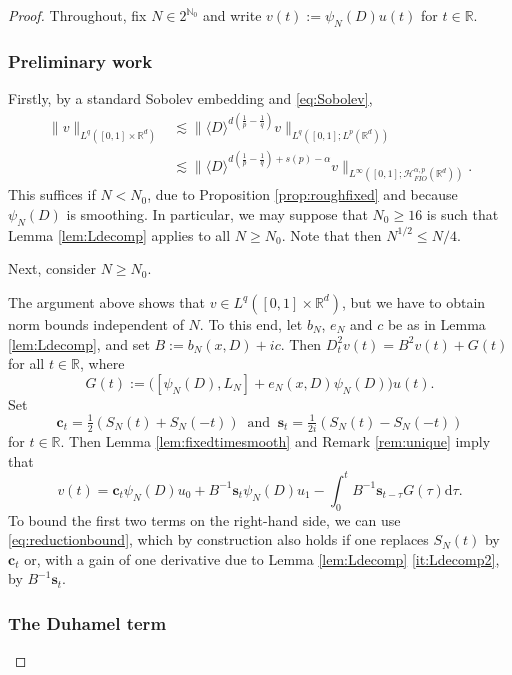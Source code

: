 \documentclass{amsart}
\numberwithin{equation}{section}
\theoremstyle{definition}
\newcommand{\R}{\mathbb{R}}
\newcommand{\Rd}{\mathbb{R}^{d}}
\newcommand{\N}{\mathbb{N}}
\newcommand {\HT}{\mathcal{H}}
\newcommand {\ud}{\mathrm{d}}
\newcommand {\rb}{\rangle}
\newcommand {\lb}{\langle}
\newcommand {\cs}{\mathbf{c}}
\newcommand {\sn}{\mathbf{s}}
\begin{document}
\begin{proof}
Throughout, fix $N\in 2^{\N_{0}}$ and %
write $v(t):=\psi_{N}(D)u(t)$ for $t\in\R$. 

\subsubsection*{Preliminary work}


Firstly, by a standard Sobolev embedding and \eqref{eq:Sobolev},  
\begin{align*}
\|v\|_{L^{q}([0,1]\times\Rd)}&\lesssim \|\lb D\rb^{d(\frac{1}{p}-\frac{1}{q})}v\|_{L^{q}([0,1];L^{p}(\Rd))}\\
&\lesssim \|\lb D\rb^{d(\frac{1}{p}-\frac{1}{q})+s(p)-\alpha}v\|_{L^{\infty}([0,1];\HT^{\alpha,p}_{FIO}(\Rd))}.
\end{align*}
This suffices if $N<N_{0}$, due to Proposition \ref{prop:roughfixed} and because $\psi_{N}(D)$ is smoothing. In particular, we may suppose that $N_{0}\geq 16$ is such that Lemma \ref{lem:Ldecomp} applies to all $N\geq N_{0}$. Note that then $N^{1/2}\leq N/4$. 

Next, consider $N\geq N_{0}$. 

The argument above shows that $v\in L^{q}([0,1]\times\Rd)$, but we have to obtain norm bounds independent of $N$. To this end, let $b_{N}$, $e_{N}$ and $c$ be as in Lemma \ref{lem:Ldecomp}, and set $B:=b_{N}(x,D)+ic$. Then 
$D_{t}^{2}v(t)=B^{2}v(t)+G(t)$ for all $t\in\R$, where 
\[
G(t):=\big([\psi_{N}(D),L_{N}]+e_{N}(x,D)\psi_{N}(D)\big)u(t).
\]
Set
\[
\cs_{t}=\tfrac{1}{2}(S_{N}(t)+S_{N}(-t))\ \text{ and }\  \sn_{t}=\tfrac{1}{2i}(S_{N}(t)-S_{N}(-t))
\]
for $t\in\R$. %
Then Lemma \ref{lem:fixedtimesmooth} and Remark \ref{rem:unique} imply that
\begin{equation}\label{eq:uDuhamel}
v(t)=\cs_{t}\psi_{N}(D)u_{0}+B^{-1}\sn_{t}\psi_{N}(D)u_{1}-\int_{0}^{t}B^{-1}\sn_{t-\tau}G(\tau)\ud\tau.
\end{equation}
To bound the first two terms on the right-hand side, we can use \eqref{eq:reductionbound}, which by construction also holds if one replaces $S_{N}(t)$ by $\cs_{t}$ or, with a gain of one derivative due to Lemma \ref{lem:Ldecomp} \eqref{it:Ldecomp2}, by $B^{-1}\sn_{t}$.


\subsubsection*{The Duhamel term}


\end{proof}
\end{document}

